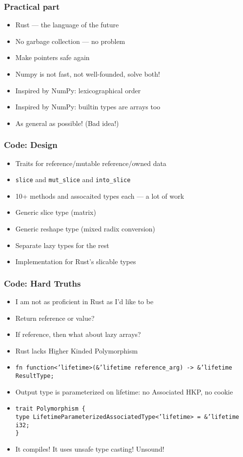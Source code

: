 \documentclass[xetex,mathserif,serif]{beamer}
\begin{document}
\begin{frame}
  \frametitle{Practical part}
  \begin{itemize}%
    \item Rust --- the language of the future
    \item No garbage collection --- no problem
    \item Make pointers safe again
    \item Numpy is not fast, not well-founded, solve both!
    \item Inspired by NumPy: lexicographical order
    \item Inspired by NumPy: builtin types are arrays too
    \item As general as possible! (Bad idea!)
  \end{itemize}
\end{frame}

\begin{frame}
  \frametitle{Code: Design}
  \begin{itemize}%
    \item Traits for reference/mutable reference/owned data
    \item \texttt{slice} and \texttt{mut\_slice} and \texttt{into\_slice}
    \item 10+ methods and assocaited types each --- a lot of work
    \item Generic slice type (matrix)
    \item Generic reshape type (mixed radix conversion)
    \item Separate lazy types for the rest
    \item Implementation for Rust's slicable types
  \end{itemize}
\end{frame}

\begin{frame}
  \frametitle{Code: Hard Truths}
  \begin{itemize}%
    \item I am not as proficient in Rust as I'd like to be
    \item Return reference or value?
    \item If reference, then what about lazy arrays?
    \item Rust lacks Higher Kinded Polymorphism
    \item \texttt{fn function<'lifetime>(\&'lifetime reference\_arg) -> \&'lifetime ResultType;}
    \item Output type is parameterized on lifetime: no Associated HKP, no cookie
    \item \texttt{trait Polymorphism \{\\
            type LifetimeParameterizedAssociatedType<'lifetime> = \&'lifetime i32;\\
                  \}}
    \item It compiles! It uses unsafe type casting! Unsound!
  \end{itemize}
\end{frame}
\end{document}
